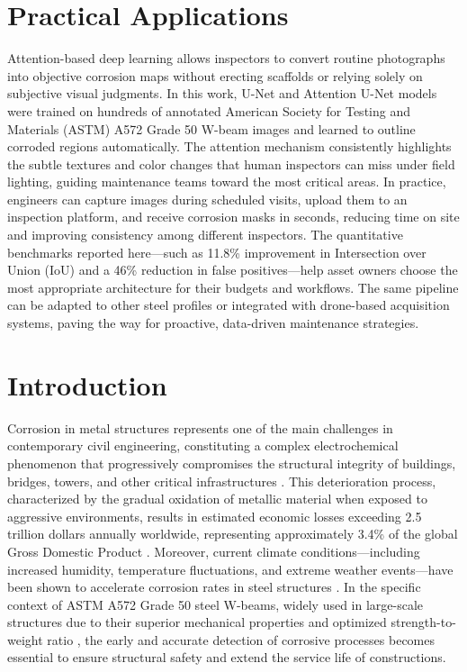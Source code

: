 \documentclass[Journal,letterpaper]{ascelike-new}
\begin{document}

\section{Practical Applications}
Attention-based deep learning allows inspectors to convert routine photographs into objective corrosion maps without erecting scaffolds or relying solely on subjective visual judgments. In this work, U-Net and Attention U-Net models were trained on hundreds of annotated American Society for Testing and Materials (ASTM) A572 Grade 50 W-beam images and learned to outline corroded regions automatically. The attention mechanism consistently highlights the subtle textures and color changes that human inspectors can miss under field lighting, guiding maintenance teams toward the most critical areas. In practice, engineers can capture images during scheduled visits, upload them to an inspection platform, and receive corrosion masks in seconds, reducing time on site and improving consistency among different inspectors. The quantitative benchmarks reported here—such as 11.8\% improvement in Intersection over Union (IoU) and a 46\% reduction in false positives—help asset owners choose the most appropriate architecture for their budgets and workflows. The same pipeline can be adapted to other steel profiles or integrated with drone-based acquisition systems, paving the way for proactive, data-driven maintenance strategies.

\section{Introduction}
\label{sec:introduction}

Corrosion in metal structures represents one of the main challenges in contemporary civil engineering, constituting a complex electrochemical phenomenon that progressively compromises the structural integrity of buildings, bridges, towers, and other critical infrastructures \cite{fontana2005corrosion,revie2011uhlig}. This deterioration process, characterized by the gradual oxidation of metallic material when exposed to aggressive environments, results in estimated economic losses exceeding 2.5 trillion dollars annually worldwide, representing approximately 3.4\% of the global Gross Domestic Product \cite{koch2016cost}. Moreover, current climate conditions---including increased humidity, temperature fluctuations, and extreme weather events---have been shown to accelerate corrosion rates in steel structures \cite{chen2023deep,garcia2023uav,kumar2024deep}. In the specific context of ASTM A572 Grade 50 steel W-beams, widely used in large-scale structures due to their superior mechanical properties and optimized strength-to-weight ratio \cite{astm2018a572}, the early and accurate detection of corrosive processes becomes essential to ensure structural safety and extend the service life of constructions.
\end{document}
